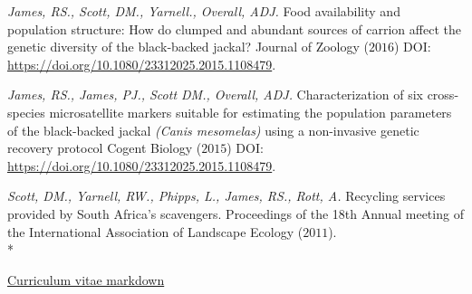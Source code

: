 \documentclass[hidelinks]{james-cv} %
\begin{document}
\begin{reflist}
\ent
\textit{James, RS., Scott, DM., Yarnell., Overall, ADJ. } {Food availability and population structure: How do clumped and abundant sources of carrion affect the genetic diversity of the black‐backed jackal? } {Journal of Zoology \color{gray}($2016$) \bodyfontsc DOI: \thinfont\color{blue}\href{https://www.tandfonline.com/doi/full/10.1080/23312025.2015.1108479}{https://doi.org/10.1080/23312025.2015.1108479}.}

\ent
\textit{James, RS., James, PJ., Scott DM., Overall, ADJ. } {Characterization of six cross-species microsatellite markers suitable for estimating the population parameters of the black-backed jackal \textit{(Canis mesomelas)} \textrm using a non-invasive genetic recovery protocol } {Cogent Biology \color{gray}($2015$) \bodyfontsc DOI: \thinfont\color{blue}\href{https://www.tandfonline.com/doi/full/10.1080/23312025.2015.1108479}{https://doi.org/10.1080/23312025.2015.1108479}.}

\ent
\textit{Scott, DM., Yarnell, RW., Phipps, L., James, RS., Rott, A.} { Recycling services provided by South Africa’s scavengers.} {Proceedings of the 18th Annual meeting of the International Association of Landscape Ecology \color{gray} ($2011$).}\\*

\end{reflist}

\hspace{-21.5\parskip}\thinfont\footnotesize\color{blue}\href{https://github.com/BadgerRob/CV_Markdown_backup}{Curriculum vitae markdown}
\end{document}
